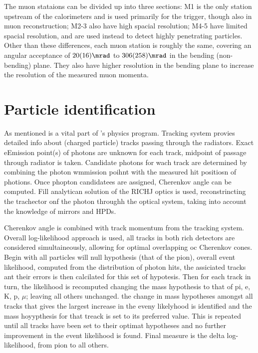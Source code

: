 The muon stataions can be divided up into three sections: M1 is the only station upstream of the
calorimeters and is used primarily for the trigger, though also in muon reconstruction; M2-3 also
have high spacial resolution; M4-5 have limited spacial resolution, and are used instead to detect
highly penetrating particles.
Other than these differences, each muon station is roughly the same, covering an angular acceptance
of $20(16)\mrad$ to $306(258)\mrad$ in the bending (non-bending) plane.
They also have higher resolution in the bending plane to increase the resolution of the measured
muon momenta.




\section{Particle identification}
As mentioned \pid is a vital part of \lhcb's physics program.
Tracking system provies detailed info about (charged particle) tracks passing through the \rich
radiators.
Exact eEmission point(s) of photons are unknown for each track, midpoint of passage through
radiator is taken.
Candidate photons  for wach track are determined by combining the photon wmmission poihnt with the
measured hit positiosn of photions.
Once phopton candidatees are assigned, Cherenkov angle can be computed.
Fill analytican solution of the RICHJ optics is used, reconstrincting the trachector onf the photon
throughh the \rich optical system, taking into account the knowledge of mirrors and HPDs.


Cherenkov angle is combined with track momentum from the tracking system.
Overall log-likelihood approach is used, all tracks in both rich detectors are considered
simultaineously, allowing for optimal overlapping oc Cherenkov cones.
Begin with all particles will null \pid hypothesis (that of the pion), overall event likelihood,
computed from the distribution of photon hits, the assiciated tracks ant their errors is then
calcilated for this set of hypotesis. Then for each track in turn, the likelihood is recomputed
changing the mass hypothesis to that of pi, e, K, p, $\mu$; leaving all others unchanged.
the change in mass hypotheses amongst all tracks that gives the largest increase in the eveny
likelyhood is identified and the mass hoyypthesis for that treack is set to its preferred  value.
This is repeated until all tracks have been set to their optimat hypotheses and no further
improvement in the event likelihood is found.
Final measure is the delta log-likelihood, from pion to all others.

